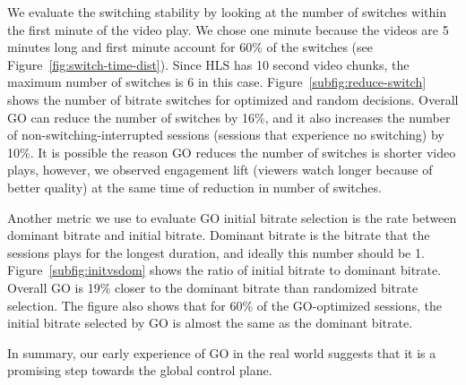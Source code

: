 We evaluate the switching stability by looking at the number of switches within the first minute of the video play.
We chose one minute because the videos are 5 minutes long and first minute account for 60\% of the switches (see Figure~\ref{fig:switch-time-dist}). 
Since HLS has 10 second video chunks, the maximum number of switches is 6 in this case.
Figure~\ref{subfig:reduce-switch} shows the number of bitrate switches for optimized and random decisions. 
Overall GO can reduce the number of switches by 16\%, and it also increases the number of non-switching-interrupted sessions 
(sessions that experience no switching) by 10\%.
It is possible the reason GO reduces the number of switches is shorter video plays, however, we observed engagement lift
(viewers watch longer because of better quality) at the same time of reduction in number of switches.



\begin{figure}[h!]
\centering
{}
\hspace{-0.6cm}
\label{fig:bitrate-stability}
\end{figure}


Another metric we use to evaluate GO initial bitrate selection is the rate between dominant bitrate and initial bitrate. Dominant bitrate
is the bitrate that the sessions plays for the longest duration, and ideally this number should be 1. Figure~\ref{subfig:initvsdom} shows the ratio of initial bitrate to dominant bitrate. Overall GO is 19\% closer to the dominant bitrate than randomized bitrate selection. 
The figure also shows that for 60\% of the GO-optimized sessions, the initial bitrate selected by GO is almost the same as the dominant bitrate.





In summary, our early experience of GO in the real world suggests that it is a promising step towards the global control plane.
